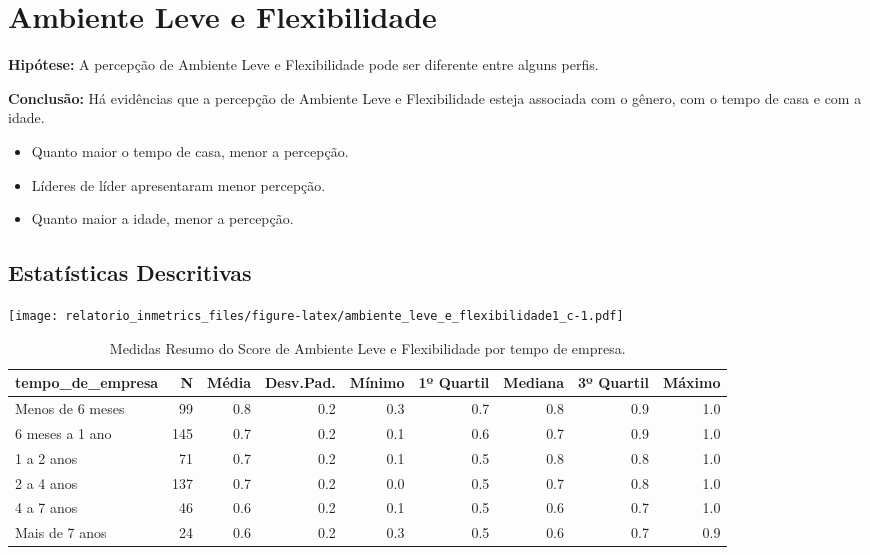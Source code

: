 \documentclass[]{book}
\providecommand{\tightlist}{%
  \setlength{\itemsep}{0pt}\setlength{\parskip}{0pt}}
\begin{document}
\pagebreak

\hypertarget{ambiente-leve-e-flexibilidade-1}{%
\section{Ambiente Leve e Flexibilidade}\label{ambiente-leve-e-flexibilidade-1}}

\textbf{Hipótese:} A percepção de Ambiente Leve e Flexibilidade pode ser diferente entre alguns perfis.

\textbf{Conclusão:} Há evidências que a percepção de Ambiente Leve e Flexibilidade esteja associada com o gênero, com o tempo de casa e com a idade.

\begin{itemize}
\tightlist
\item
  Quanto maior o tempo de casa, menor a percepção.
\item
  Líderes de líder apresentaram menor percepção.
\item
  Quanto maior a idade, menor a percepção.
\end{itemize}

\hypertarget{estatisticas-descritivas-11}{%
\subsection{Estatísticas Descritivas}\label{estatisticas-descritivas-11}}

\texttt{[image: relatorio\_inmetrics\_files/figure-latex/ambiente\_leve\_e\_flexibilidade1\_c-1.pdf]}

\begin{table}[t]

\caption{\label{tab:unnamed-chunk-30}Medidas Resumo do Score de Ambiente Leve e Flexibilidade por tempo de empresa.}
\centering
\fontsize{7}{9}\selectfont
\begin{tabular}{lrrrrrrrr}
\toprule
tempo\_de\_empresa & N & Média & Desv.Pad. & Mínimo & 1º Quartil & Mediana & 3º Quartil & Máximo\\
\midrule
Menos de 6 meses & 99 & 0.8 & 0.2 & 0.3 & 0.7 & 0.8 & 0.9 & 1.0\\
6 meses a 1 ano & 145 & 0.7 & 0.2 & 0.1 & 0.6 & 0.7 & 0.9 & 1.0\\
1 a 2 anos & 71 & 0.7 & 0.2 & 0.1 & 0.5 & 0.8 & 0.8 & 1.0\\
2 a 4 anos & 137 & 0.7 & 0.2 & 0.0 & 0.5 & 0.7 & 0.8 & 1.0\\
4 a 7 anos & 46 & 0.6 & 0.2 & 0.1 & 0.5 & 0.6 & 0.7 & 1.0\\
\addlinespace
Mais de 7 anos & 24 & 0.6 & 0.2 & 0.3 & 0.5 & 0.6 & 0.7 & 0.9\\
\bottomrule
\end{tabular}
\end{table}
\end{document}

